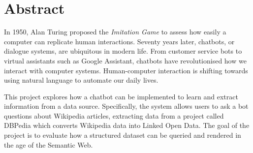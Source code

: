 \chapter*{Abstract}
In 1950, Alan Turing proposed the {\it Imitation Game} to assess how easily a computer can replicate human interactions. Seventy years later, chatbots, or dialogue systems, are ubiquitous in modern life. From customer service bots to virtual assistants such as Google Assistant, chatbots have revolutionised how we interact with computer systems. Human-computer interaction is shifting towards using natural language to automate our daily lives.

This project explores how a chatbot can be implemented to learn and extract information from a data source. Specifically, the system allows users to ask a bot questions about Wikipedia articles, extracting data from a project called DBPedia which converts Wikipedia data into Linked Open Data. The goal of the project is to evaluate how a structured dataset can be queried and rendered in the age of the Semantic Web.